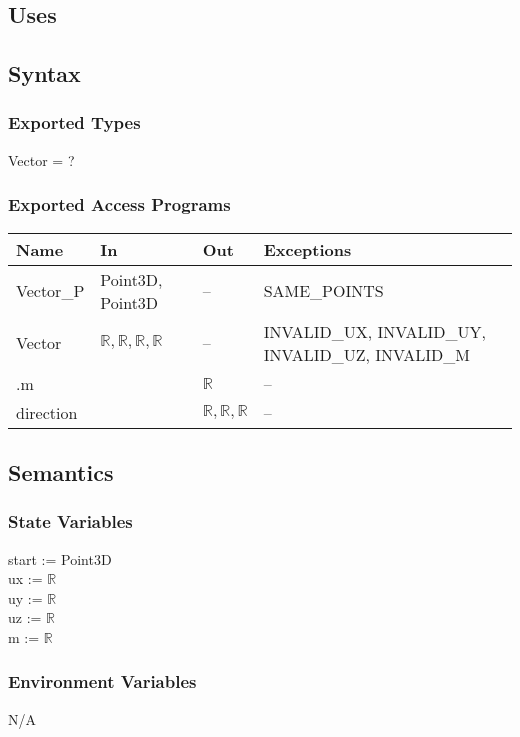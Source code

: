 \documentclass[12pt, titlepage]{article}
\begin{document}
\subsection{Uses}

\subsection{Syntax}
\subsubsection{Exported Types}
Vector = ?
\subsubsection{Exported Access Programs}
\begin{center}
	\begin{tabular}{p{4cm} p{2cm} p{2cm} p{4cm}}
		\hline
		\textbf{Name} & \textbf{In} & \textbf{Out} & \textbf{Exceptions} \\
		\hline
		Vector\_P & Point3D, Point3D & -- & SAME\_POINTS \\
		Vector & $ \mathbb{R},\mathbb{R},\mathbb{R},\mathbb{R} $ & -- & 
		INVALID\_UX, INVALID\_UY, INVALID\_UZ, INVALID\_M \\
		.m & & $\mathbb{R}$ & -- \\
		direction & & $ \mathbb{R},\mathbb{R},\mathbb{R}$  & -- 
		\\	
		\hline
	\end{tabular}
\end{center}


\subsection{Semantics}
\subsubsection{State Variables}
start := Point3D \\
ux := $\mathbb{R}$ \\
uy := $\mathbb{R}$ \\
uz := $\mathbb{R}$ \\
m := $\mathbb{R}$ \\ 

\subsubsection{Environment Variables}
N/A
\end{document}
